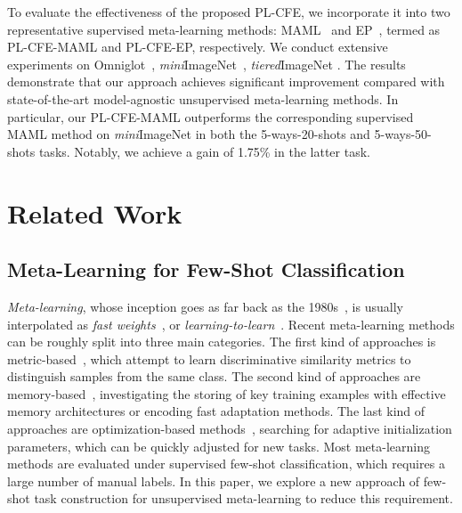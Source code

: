 \documentclass[runningheads]{llncs}
\def\ourmodel{PL-CFE}
\begin{document}
To evaluate the effectiveness of the proposed \ourmodel, we incorporate it into two representative supervised meta-learning methods: MAML~\cite{hsu2018unsupervised} and EP~\cite{rodriguez2020embedding}, termed as \ourmodel-MAML and \ourmodel-EP, respectively. We conduct extensive experiments on Omniglot~\cite{lake2011one}, \textit{mini}ImageNet~\cite{ravi2016optimization}, \textit{tiered}ImageNet \cite{ren2018meta}. The results demonstrate that our approach achieves significant improvement compared with state-of-the-art model-agnostic unsupervised meta-learning methods. In particular, our \ourmodel-MAML outperforms the corresponding supervised MAML method on \textit{mini}ImageNet in both the 5-ways-20-shots and 5-ways-50-shots tasks. Notably, we achieve a gain of 1.75\% in the latter task.










\section{Related Work}
\subsection{Meta-Learning for Few-Shot Classification}
{\it Meta-learning}, whose inception goes as far back as the   1980s~\cite{hinton1987using,schmidhuber1987evolutionary}, is usually interpolated as {\it fast weights}~\cite{hinton1987using,ba2016using}, or {\it learning-to-learn}~\cite{schmidhuber1987evolutionary,thrun1998learning,hochreiter2001learning,andrychowicz2016learning}. 
Recent meta-learning methods can be roughly split into three main categories. The first kind of approaches is metric-based~\cite{koch2015siamese,vinyals2016matching,snell2017prototypical,rodriguez2020embedding,chen2019closer}, which attempt to learn discriminative similarity metrics to distinguish samples from the same class. The second kind of approaches are memory-based~\cite{santoro2016meta,ravi2016optimization}, investigating the storing of key training examples with effective memory architectures or encoding fast adaptation methods. The last kind of approaches are optimization-based methods~\cite{finn2017model,finn2018probabilistic}, searching for adaptive initialization parameters, which can be quickly adjusted for new tasks. Most meta-learning methods are evaluated under supervised few-shot classification, which requires a large number of manual labels. In this paper, we explore a new approach of few-shot task construction for unsupervised meta-learning to reduce this requirement. 
\end{document}
